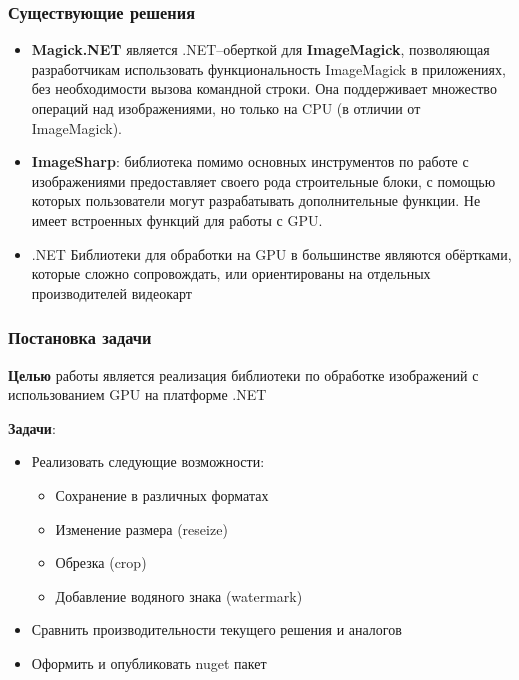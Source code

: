 \documentclass[aspectratio=169]{beamer}
\begin{document}
\begin{frame}  
  \frametitle{Существующие решения}
    \begin{itemize}
    
        \item \textbf{Magick.NET} является .NET--оберткой для \textbf{ImageMagick}, позволяющая разработчикам использовать функциональность ImageMagick в приложениях, без необходимости вызова командной строки. Она поддерживает множество операций над изображениями, но только на CPU (в отличии от ImageMagick).
    
        \item \textbf{ImageSharp}: библиотека помимо основных инструментов по работе с изображениями предоставляет своего рода строительные блоки, с помощью которых пользователи могут разрабатывать дополнительные функции. Не имеет встроенных функций для работы с GPU.

        \item .NET Библиотеки для обработки на GPU в большинстве являются обёртками, которые сложно сопровождать, или ориентированы на отдельных производителей видеокарт
    \end{itemize}
    
\end{frame}

\begin{frame}
  \frametitle{Постановка задачи}
  \textbf{Целью} работы является реализация библиотеки по обработке изображений с использованием GPU на платформе .NET %
  
  \textbf{Задачи}:
  \begin{itemize}
    \item Реализовать следующие возможности:
    \begin{itemize}
        \item Сохранение в различных форматах
        \item Изменение размера (reseize)
        \item Обрезка (crop)
        \item Добавление водяного знака (watermark)
    \end{itemize}
    \item Сравнить производительности текущего решения и аналогов 
    \item Оформить и опубликовать nuget пакет
  \end{itemize}
\end{frame}
\end{document}
